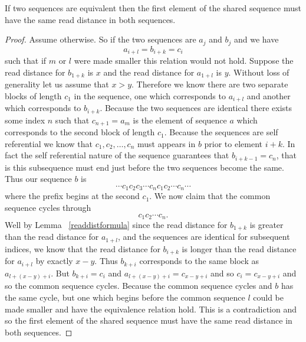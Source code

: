 \documentclass[runningheads,a4paper]{llncs}
\begin{document}
\begin{theorem} If two sequences are equivalent then the first element of the shared sequence must have the same read distance in both sequences.
\end{theorem}
\begin{proof}
Assume otherwise. So if the two sequences are $a_j$ and $b_j$ and we have 
\begin{equation*}
a_{i+l} = b_{i+k} = c_{i}
\end{equation*}
such that if $m$ or $l$ were made smaller this relation would not hold. Suppose the read distance for $b_{1+k}$ is $x$ and the read distance for $a_{1+l}$ is $y$. Without loss of generality let us assume that $x>y$. 
Therefore we know there are two separate blocks of length $c_1$ in the sequence, one which corresponds to $a_{i+l}$ and another which corresponds to $b_{i+k}$.
Because the two sequences are identical there exists some index $n$ such that $c_{n+1}=a_{m}$ is the element of sequence $a$ which corresponds to the second block of length $c_1$. 
Because the sequences are self referential we know that $c_1, c_2, \ldots, c_{n}$  must appears in $b$ prior to element $i+k$. In fact the self referential nature of the sequence guarantees that $b_{i+k-1}=c_{n}$, that is this subsequence must end just before the two sequences become the same. Thus our sequence $b$ is  
\begin{equation*}
\cdots c_1 c_2 c_3 \cdots c_{n} c_1 c_2 \cdots c_n \cdots
\end{equation*}
where the prefix begins at the second $c_1$. We now claim that the common sequence cycles through
\begin{equation*}
c_1 c_2 \cdots c_n.
\end{equation*}
Well by Lemma ~\ref{readdistformula} since the read distance for $b_{1+k}$ is greater than the read distance for $a_{1+l}$, and the sequences are identical for subsequent indices, we know that the read distance for $b_{i+k}$ is longer than the read distance for $a_{i+l}$ by exactly $x-y$. Thus $b_{k+i}$ corresponds to the same block as $a_{l+(x-y)+i}$. But $b_{k+i} = c_{i}$ and $a_{l+(x-y)+i}=c_{x-y+i}$ and so $c_{i} = c_{x-y+i}$ and so the common sequence cycles. Because the common sequence cycles and $b$ has the same cycle, but one which begins before the common sequence $l$ could be made smaller and have the equivalence relation hold. This is a contradiction and so the first element of the shared sequence must have the same read distance in both sequences. 
\end{proof}
\end{document}
